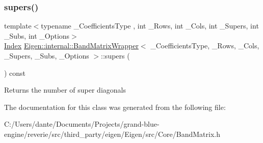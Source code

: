 \subsubsection{\texorpdfstring{supers()}{supers()}}
{\footnotesize\ttfamily template$<$typename \+\_\+\+Coefficients\+Type , int \+\_\+\+Rows, int \+\_\+\+Cols, int \+\_\+\+Supers, int \+\_\+\+Subs, int \+\_\+\+Options$>$ \\
\mbox{\hyperlink{struct_eigen_1_1_eigen_base_a554f30542cc2316add4b1ea0a492ff02}{Index}} \mbox{\hyperlink{class_eigen_1_1internal_1_1_band_matrix_wrapper}{Eigen\+::internal\+::\+Band\+Matrix\+Wrapper}}$<$ \+\_\+\+Coefficients\+Type, \+\_\+\+Rows, \+\_\+\+Cols, \+\_\+\+Supers, \+\_\+\+Subs, \+\_\+\+Options $>$\+::supers (\begin{DoxyParamCaption}{ }\end{DoxyParamCaption}) const\hspace{0.3cm}{\ttfamily [inline]}}

\begin{DoxyReturn}{Returns}
the number of super diagonals 
\end{DoxyReturn}


The documentation for this class was generated from the following file\+:\begin{DoxyCompactItemize}
\item 
C\+:/\+Users/dante/\+Documents/\+Projects/grand-\/blue-\/engine/reverie/src/third\+\_\+party/eigen/\+Eigen/src/\+Core/Band\+Matrix.\+h\end{DoxyCompactItemize}
